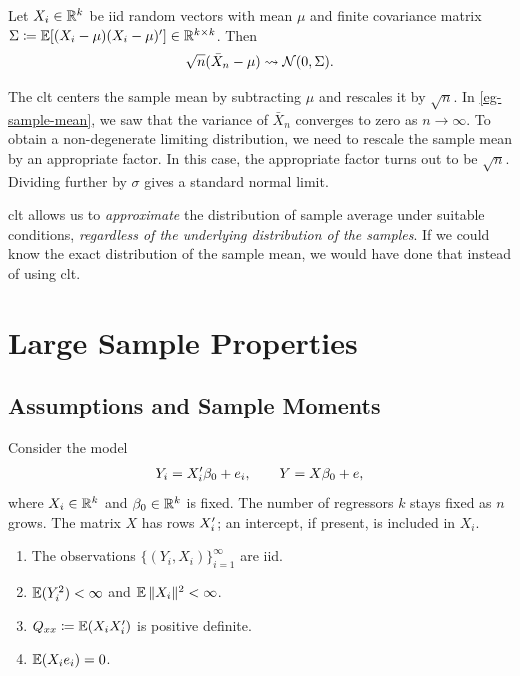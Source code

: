 \documentclass[a4paper,12pt]{article}
\begin{document}
\begin{theorem}\label{thm-clt-multi}
	Let $X_i\in\mathbb{R}^k$ be \gls{iid} random vectors with mean $\mu$
	and finite covariance matrix $\Sigma\coloneqq\operatorname{\mathbb{E}}[(X_i-\mu)(X_i-\mu)^{\prime}]\in\mathbb{R}^{k\times k}$.
	Then
	\begin{align}
		\sqrt{n}(\bar X_n-\mu)\overset{}{\leadsto}\operatorname{\mathcal{N}}(0,\Sigma).
	\end{align}
\end{theorem}

\begin{remark}
	The \gls{clt} centers the sample mean by subtracting $\mu$ and rescales it by $\sqrt{n}$.
	In \autoref{eg-sample-mean}, we saw that the variance of $\bar X_n$ converges to zero as $n\to\infty$.
	To obtain a non-degenerate limiting distribution, we need to rescale the sample mean by an appropriate factor.
	In this case, the appropriate factor turns out to be $\sqrt{n}$.
	Dividing further by $\sigma$ gives a standard normal limit.
\end{remark}

\begin{remark}
	\gls{clt} allows us to \emph{approximate} the distribution of sample average under suitable conditions,
	\emph{regardless of the underlying distribution of the samples}.
	If we could know the exact distribution of the sample mean,
	we would have done that instead of using \gls{clt}.
\end{remark}

\section{ Large Sample Properties}

\subsection{Assumptions and Sample Moments}

Consider the model
\begin{align}\label{eq-model}
	Y_i=X_i^{\prime}\beta_0+e_i,
	\qquad Y=X\beta_0+e,
\end{align}
where $X_i\in\mathbb{R}^k$ and $\beta_0\in\mathbb{R}^k$ is fixed.
The number of regressors $k$ stays fixed as $n$ grows.
The matrix $X$ has rows $X_i^{\prime}$; an intercept, if present, is included in $X_i$.

\begin{assumption}\label{ass-consistency}
	\leavevmode
	\begin{enumerate}
		\item The observations $\{(Y_i,X_i)\}_{i=1}^{\infty}$ are \gls{iid}.
		\item $\operatorname{\mathbb{E}}(Y_i^2)<\infty$ and $\operatorname{\mathbb{E}}\|X_i\|^2<\infty$.
		\item $Q_{xx}\coloneqq\operatorname{\mathbb{E}}(X_iX_i^{\prime})$ is positive definite.
		\item $\operatorname{\mathbb{E}}(X_ie_i)=0$.
	\end{enumerate}
\end{assumption}
\end{document}
